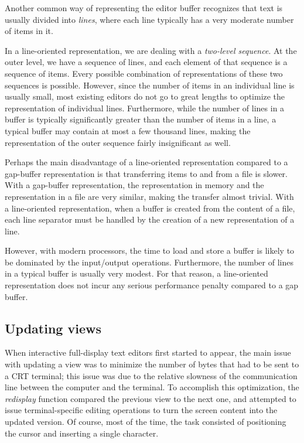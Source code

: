 Another common way of representing the editor buffer recognizes that
text is usually divided into \emph{lines}, where each line typically
has a very moderate number of items in it.

In a line-oriented representation, we are dealing with a
\emph{two-level sequence}.  At the outer level, we have a sequence of
lines, and each element of that sequence is a sequence of items.
Every possible combination of representations of these two sequences
is possible.  However, since the number of items in an individual line
is usually small, most existing editors do not go to great lengths to
optimize the representation of individual lines.  Furthermore, while
the number of lines in a buffer is typically significantly greater
than the number of items in a line, a typical buffer may contain at
most a few thousand lines, making the representation of the outer
sequence fairly insignificant as well.

Perhaps the main disadvantage of a line-oriented representation
compared to a gap-buffer representation is that transferring items to
and from a file is slower.  With a gap-buffer representation, the
representation in memory and the representation in a file are very
similar, making the transfer almost trivial.  With a line-oriented
representation, when a buffer is created from the content of a file,
each line separator must be handled by the creation of a new
representation of a line.

However, with modern processors, the time to load and store a buffer
is likely to be dominated by the input/output operations.
Furthermore, the number of lines in a typical buffer is usually very
modest.  For that reason, a line-oriented representation does not
incur any serious performance penalty compared to a gap buffer.

\subsection{Updating views}

When interactive full-display text editors first started to appear,
the main issue with updating a view was to minimize the number of
bytes that had to be sent to a CRT terminal; this issue was due to the
relative slowness of the communication line between the computer and
the terminal.  To accomplish this optimization, the \emph{redisplay}
function compared the previous view to the next one, and attempted to
issue terminal-specific editing operations to turn the screen content
into the updated version.  Of course, most of the time, the task
consisted of positioning the cursor and inserting a single character.

